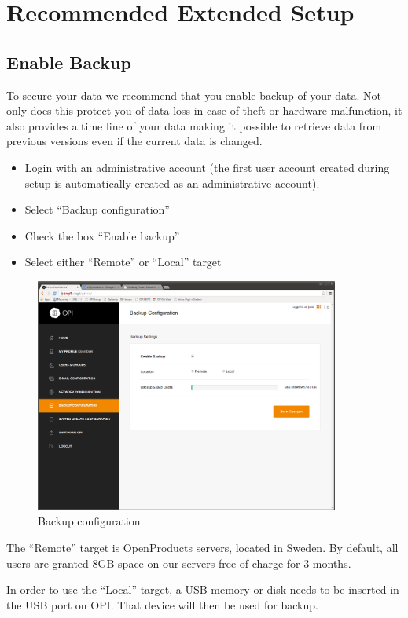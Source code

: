 \documentclass[12pt,a4paper,titlepage]{article}
\begin{document}
\newpage
\section{Recommended Extended Setup}
\subsection{Enable Backup}
To secure your data we recommend that you enable backup of your data. Not only does this protect you of data loss in case of theft or hardware malfunction, it also provides a time line of your data making it possible to retrieve data from previous versions even if the current data is changed.
\begin{itemize}
\item Login with an administrative account (the first user account created during setup is automatically created as an administrative account).
\item Select ``Backup configuration''
\item Check the box ``Enable backup''
\item Select either “Remote” or ``Local'' target
\end{itemize}

\begin{figure}[h]
\centering
\includegraphics[width=10cm]{./img/backup_config}
\caption{Backup configuration}
\end{figure}

The ``Remote'' target is OpenProducts servers, located in Sweden. By default, all users are granted 8GB space on our servers free of charge for 3 months.

In order to use the ``Local'' target, a USB memory or disk needs to be inserted in the USB port on OPI. That device will then be used for backup.
\end{document}
